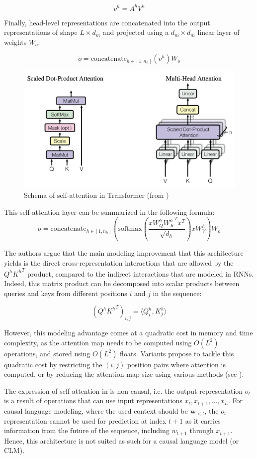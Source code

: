 $$
v^h = A^h V^h
$$

Finally, head-level representations are concatenated into the output representations of shape $L \times d_m$ and projected using a $d_m \times d_m$ linear layer of weights $W_o$:

$$
o = \text{concatenate}_{h\in [1, n_h]}(v^h) W_o
$$

\begin{figure}
    \centering
    \includegraphics[width=0.6\linewidth]{sources/related_works/imgs/transformer_attn_schema.png}
    \caption{Schema of self-attention in Transformer (from \citet{vaswani2017attention})}
    \label{fig:token_graph}
\end{figure}

This self-attention layer can be summarized in the following formula:
\begin{equation}
    \label{eq:self_attn}
o = \text{concatenate}_{h\in [1, n_h]} \left( \text{softmax} \left(\frac{x W_Q^h {W_K^h}^T x^T}{\sqrt{d_h}}\right) x W_V^h \right) W_o
\end{equation}


The authors argue that the main modeling improvement that this architecture yields is the direct cross-representation interactions that are allowed by the $Q^h {K^h}^T$ product, compared to the indirect interactions that are modeled in RNNs. Indeed, this matrix product can be decomposed into scalar products between queries and keys from different positions $i$ and $j$ in the sequence:

$$
(Q^h {K^h}^T)_{i, j} = \langle Q^h_i , K^h_j \rangle
$$

However, this modeling advantage comes at a quadratic cost in memory and time complexity, as the attention map needs to be computed using $O(L^2)$ operations, and stored using $O(L^2)$ floats. Variants propose to tackle this quadratic cost by restricting the $(i, j)$ position pairs where attention is computed, or by reducing the attention map size using various methods (see ).

The expression of self-attention in  is non-causal, i.e. the output representation $o_t$ is a result of operations that can use input representations $x_t, x_{t+1}, ..., x_L$. For causal language modeling, where the used context should be $\mathbf{w}_{< t}$, the $o_t$ representation cannot be used for prediction at index $t + 1$ as it carries information from the future of the sequence, including $w_{t+1}$ through $x_{t+1}$. Hence, this architecture is not suited as such for a causal language model (or CLM).

